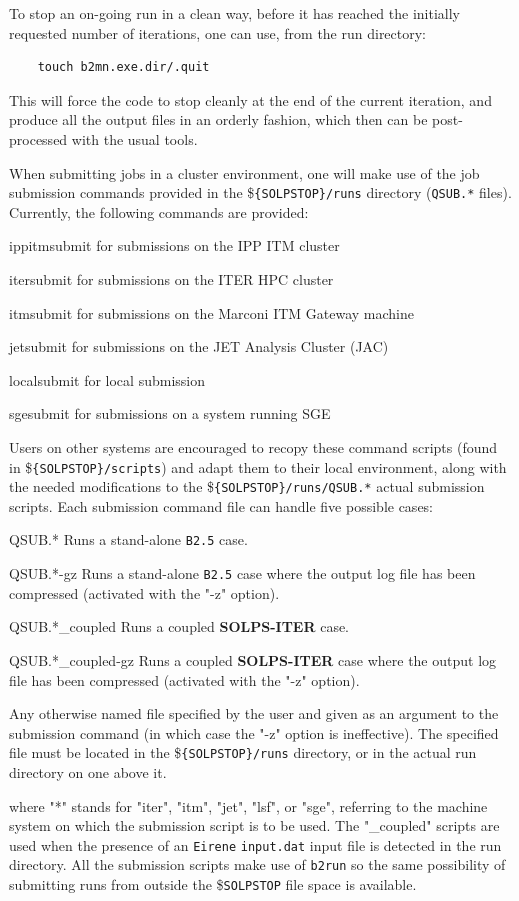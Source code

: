 \documentclass[a4paper,10pt]{report}
\newcommand\SOLPSITER{{\bf SOLPS-ITER} }
\begin{document}
To stop an on-going run in a clean way, before it has reached the initially requested
number of iterations, one can use, from the run directory:
\begin{verbatim}
    touch b2mn.exe.dir/.quit
\end{verbatim}
This will force the code to stop cleanly at the end of the current iteration, and
produce all the output files in an orderly fashion, which then can be post-processed
with the usual tools.

When submitting jobs in a cluster environment, one will make use of the job submission commands provided
in the \${\tt \{SOLPSTOP\}/runs} directory ({\tt QSUB.*} files). Currently, the following commands
are provided:
\begin{description}
  \item{ippitmsubmit} for submissions on the IPP ITM cluster
  \item{itersubmit} for submissions on the ITER HPC cluster
  \item{itmsubmit} for submissions on the Marconi ITM Gateway machine
  \item{jetsubmit} for submissions on the JET Analysis Cluster (JAC)
  \item{localsubmit} for local submission
  \item{sgesubmit} for submissions on a system running SGE
\end{description}
Users on other systems are encouraged to recopy these command scripts (found in \${\tt \{SOLPSTOP\}/scripts})
and adapt them to their local environment, along
with the needed modifications to the \${\tt \{SOLPSTOP\}/runs/QSUB.*} actual submission scripts.
Each submission command file can handle five possible cases:
\begin{description}
  \item{QSUB.*} Runs a stand-alone {\tt B2.5} case.
  \item{QSUB.*-gz} Runs a stand-alone {\tt B2.5} case where the output log file has been compressed (activated with the "-z" option).
  \item{QSUB.*\_coupled} Runs a coupled \SOLPSITER case.
  \item{QSUB.*\_coupled-gz} Runs a coupled \SOLPSITER case where the output log file has been compressed (activated with the "-z" option).
  \item{ } Any otherwise named file specified by the user and given as an argument to the submission command (in which case the "-z" option is ineffective). The specified file must be located in the \${\tt \{SOLPSTOP\}/runs} directory, or in the actual run directory on one above it.
\end{description}
where "*" stands for "iter", "itm", "jet", "lsf", or "sge", referring to the machine system on which the
submission script is to be used. The "\_coupled" scripts are used when the presence of an {\tt Eirene}
{\tt input.dat} input file is detected in the run directory.
All the submission scripts make use of {\tt b2run} so the same possibility of submitting runs from
outside the \${\tt SOLPSTOP} file space is available.
\end{document}
